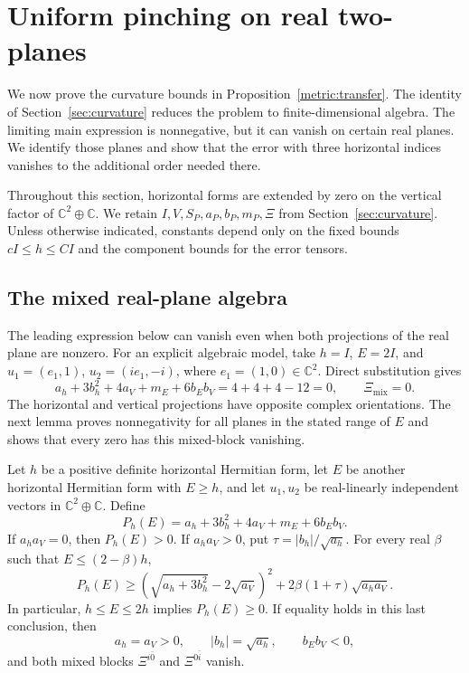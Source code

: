 \section{Uniform pinching on real two-planes}\label{sec:pinching}

We now prove the curvature bounds in Proposition~\ref{metric:transfer}.
The identity of Section~\ref{sec:curvature} reduces the problem to
finite-dimensional algebra.  The limiting main expression is nonnegative,
but it can vanish on certain real planes.
We identify those planes and show that the error with three horizontal
indices vanishes to the additional order needed there.

Throughout this section, horizontal forms are extended by zero on the
vertical factor of \(\mathbb C^2\oplus\mathbb C\).
We retain \(I,V,S_P,a_P,b_P,m_P,\Xi\) from
Section~\ref{sec:curvature}.  Unless otherwise indicated, constants depend
only on the fixed bounds \(cI\le h\le CI\) and the component bounds for
the error tensors.

\subsection{The mixed real-plane algebra}

The leading expression below can vanish even when both projections
of the real plane are nonzero.  For an explicit algebraic model, take
$h=I$, $E=2I$, and
$u_1=(e_1,1)$, $u_2=(ie_1,-i)$, where $e_1=(1,0)\in\mathbb C^2$.
Direct substitution gives
\[
 a_h+3b_h^2+4a_V+m_E+6b_Eb_V=4+4+4-12=0,
 \qquad \Xi_{\mathrm{mix}}=0.
\]
The horizontal and vertical projections have opposite complex
orientations.  The next lemma proves nonnegativity for all planes in
the stated range of $E$ and shows that every zero has this mixed-block
vanishing.

\begin{lemma}\label{pinch:algebra}
Let \(h\) be a positive definite horizontal Hermitian form, let \(E\) be
another horizontal Hermitian form with \(E\ge h\), and let \(u_1,u_2\)
be real-linearly independent vectors in \(\mathbb C^2\oplus\mathbb C\).
Define
\[
 P_h(E)=a_h+3b_h^2+4a_V+m_E+6b_Eb_V.
\]
If \(a_ha_V=0\), then \(P_h(E)>0\).
If \(a_ha_V>0\), put \(\tau=|b_h|/\sqrt{a_h}\).
For every real \(\beta\) such that \(E\le(2-\beta)h\),
\begin{equation}\label{pinch:square}
 P_h(E)\ge
 \left(\sqrt{a_h+3b_h^2}-2\sqrt{a_V}\right)^2
 +2\beta(1+\tau)\sqrt{a_ha_V}.
\end{equation}
In particular, \(h\le E\le2h\) implies \(P_h(E)\ge0\).
If equality holds in this last conclusion, then
\[
 a_h=a_V>0,\qquad |b_h|=\sqrt{a_h},\qquad b_Eb_V<0,
\]
and both mixed blocks \(\Xi^{i\bar0}\) and \(\Xi^{0\bar i}\) vanish.
\end{lemma}

